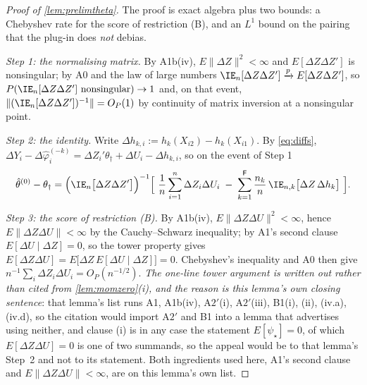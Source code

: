 \begin{proof}[Proof of \cref{lem:prelimtheta}]
The proof is exact algebra plus two bounds: a Chebyshev rate for the score of restriction (B), and an
$L^{1}$ bound on the pairing that the plug-in does \emph{not} debias.

\emph{Step 1: the normalising matrix.} By A1b(iv), $E\|\Delta Z\|^{2}<\infty$ and $E[\Delta Z\Delta Z']$ is
nonsingular; by A0 and the law of large numbers $\IE_n[\Delta Z\Delta Z']\xrightarrow{p}E[\Delta Z\Delta Z']$,
so $P(\IE_n[\Delta Z\Delta Z']\ \text{nonsingular})\to1$ and, on that event,
$\|(\IE_n[\Delta Z\Delta Z'])^{-1}\|=O_P(1)$ by continuity of matrix inversion at a nonsingular point.

\emph{Step 2: the identity.} Write $\Delta h_{k,i}:=h_k(X_{i2})-h_k(X_{i1})$. By \eqref{eq:diffs},
$\Delta Y_i-\Delta\hat\varphi^{(-k)}_i=\Delta Z_i'\theta_\dagger+\Delta U_i-\Delta h_{k,i}$, so on the event of
Step 1
\[
\hat\theta^{(0)}-\theta_\dagger
=\Big(\IE_n\big[\Delta Z\Delta Z'\big]\Big)^{-1}
\Big[\ \frac1n\sum_{i=1}^{n}\Delta Z_i\Delta U_i
\;-\;\sum_{k=1}^{\mathsf F}\frac{n_k}{n}\,\IE_{n,k}\big[\Delta Z\,\Delta h_k\big]\ \Big].
\]

\emph{Step 3: the score of restriction \textup{(B)}.} By A1b(iv), $E\|\Delta Z\Delta U\|^{2}<\infty$, hence
$E\|\Delta Z\Delta U\|<\infty$ by the Cauchy--Schwarz inequality; by A1's second clause
$E[\Delta U\mid\Delta Z]=0$, so the tower property gives
$E[\Delta Z\Delta U]=E\big[\Delta Z\,E[\Delta U\mid\Delta Z]\big]=0$. Chebyshev's inequality and A0 then give
$n^{-1}\sum_i\Delta Z_i\Delta U_i=O_P(n^{-1/2})$. \emph{The one-line tower argument is written out rather
than cited from \cref{lem:momzero}\textup{(i)}, and the reason is this lemma's own closing sentence}: that
lemma's list runs A1, A1b(iv), A$2'$(i), A$2'$(iii), B1(i), (ii), (iv.a), (iv.d), so the citation would import
A$2'$ and B1 into a lemma that advertises using neither, and clause \textup{(i)} is in any case the
statement $E[\psi_\star]=0$, of which $E[\Delta Z\Delta U]=0$ is one of two summands, so the appeal would be
to that lemma's Step~2 and not to its statement. Both ingredients used here, A1's second clause and
$E\|\Delta Z\Delta U\|<\infty$, are on this lemma's own list.


\end{proof}
